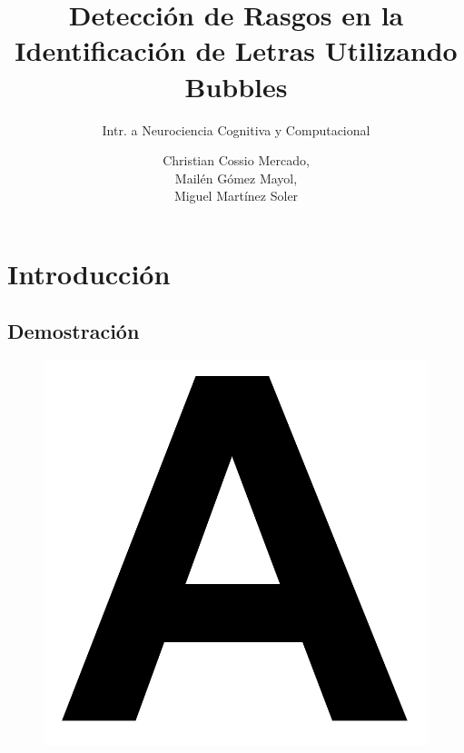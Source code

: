 \documentclass{beamer}
\title{Detecci\'on de Rasgos en la Identificaci\'on de Letras Utilizando Bubbles}
\subtitle{Intr. a Neurociencia Cognitiva y Computacional}
\author[Mart\'inez Soler,\\G\'omez Mayol,\\Cossio Mercado]{Christian Cossio Mercado,\\Mail\'en G\'omez Mayol,\\Miguel Mart\'inez Soler}
\institute{Departamento de Computaci\'on - FCEyN, UBA}
\begin{document}
\begin{frame}
 \titlepage
\end{frame}

\section{Introducci\'on}
\subsection{Demostración}

\begin{frame}
 \begin{figure}
  \includegraphics[scale=.2]{graficos/letra.png}
 \end{figure}
\end{frame}
\end{document}
